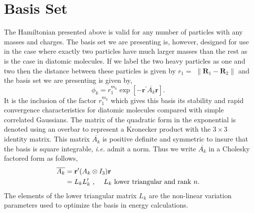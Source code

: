 \documentclass[12pt]{article}
\begin{document}
\section{Basis Set}

The Hamiltonian presented above is valid for any number of particles with any
masses and charges. The basis set we are presenting is, however, designed for
use in the case where exactly two particles have much larger masses than the
rest as is the case in diatomic molecules. If we label the two heavy particles
as one and two then the distance between these particles is given by $r_{1}=$
$\left\|  \mathbf{R}_{1}-\mathbf{R}_{2}\right\|  $ and the basis set we are
presenting is given by,
\begin{equation}
\phi_{k}=r_{1}^{m_{k}}\exp\left[  -\mathbf{r}^{\prime}\overline{A_{k}%
}\mathbf{r}\right]  .\label{basis1}%
\end{equation}
It is the inclusion of the factor $r_{1}^{m_{k}}$ which gives this basis its
stability and rapid convergence characteristics for diatomic molecules
compared with simple correlated Gaussians. The matrix of the quadratic form in
the exponential is denoted using an overbar to represent a Kronecker product
with the $3\times3$ identity matrix. This matrix $\overline{A_{k}}$ is
positive definite and symmetric to insure that the basis is square integrable,
\textit{i.e.} admit a norm. Thus we write $\overline{A_{k}}$ in a Cholesky
factored form as follows,\qquad%
\begin{align}
\overline{A_{k}} &  =\mathbf{r}^{\prime}(A_{k}\otimes I_{3})\mathbf{r}\\
&  =L_{k}L_{k}^{\prime}\text{ ,\thinspace\thinspace\thinspace\thinspace
\thinspace\thinspace\thinspace\thinspace}L_{k}\text{ lower triangular and rank
}n.\nonumber
\end{align}
The elements of the lower triangular matrix $L_{k}$ are the non-linear
variation parameters used to optimize the basis in energy calculations.
\end{document}
